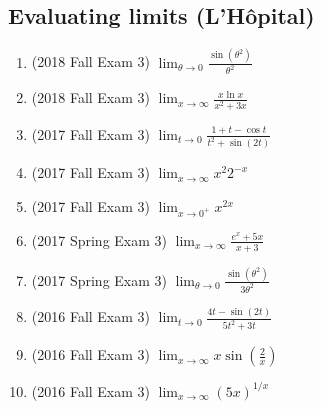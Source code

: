 \documentclass[10pt]{scrartcl}
\begin{document}
\subsection{Evaluating limits (L'H\^{o}pital)}
\begin{enumerate}
\item (2018 Fall Exam 3) $\lim_{\theta \to 0} \frac{\sin(\theta^2)}{\theta^2}$
\item (2018 Fall Exam 3) $\lim_{x\to\infty} \frac{x \ln x}{x^2 + 3x}$
\item (2017 Fall Exam 3) $\lim_{t\to0} \frac{1+t-\cos t}{t^2 + \sin(2t)}$
\item (2017 Fall Exam 3) $\lim_{x\to\infty} x^2 2^{-x}$
\item (2017 Fall Exam 3) $\lim_{x\to0^+} x^{2x}$
\item (2017 Spring Exam 3) $\lim_{x\to\infty} \frac{e^x + 5x}{x + 3}$
\item (2017 Spring Exam 3) $\lim_{\theta\to0} \frac{\sin(\theta^2)}{3\theta^2}$
\item (2016 Fall Exam 3) $\lim_{t\to 0} \frac{4t-\sin(2t)}{5t^2 + 3t}$
\item (2016 Fall Exam 3) $\lim_{x\to\infty} x \sin(\frac 2x)$
\item (2016 Fall Exam 3) $\lim_{x\to\infty} (5x)^{1/x}$
\end{enumerate}
\end{document}
